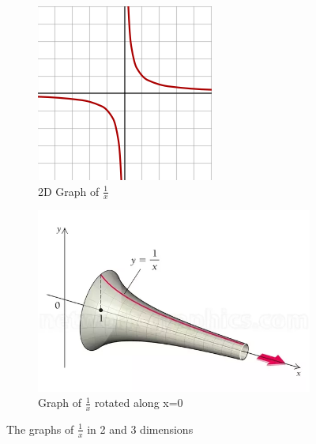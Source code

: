 \documentclass{article}
\begin{document}
\begin{figure}[h]
    \centering
    \begin{subfigure}[b]{0.4\linewidth}
      \includegraphics[width=\linewidth]{Graph 1.png}
      \caption{2D Graph of $\frac{1}{x}$}
    \end{subfigure}
    \hspace{4mm}
    \begin{subfigure}[b]{0.4\linewidth}
      \includegraphics[width=\linewidth]{Graph 2.png}
      \caption{Graph of $\frac{1}{x}$ rotated along x=0}
      \begin{minipage}{.1cm}
      \vfill
      \end{minipage}
    \end{subfigure}
    \caption{The graphs of $\frac{1}{x}$ in 2 and 3 dimensions}
    \label{fig:my_label}
\end{figure}
\end{document}
